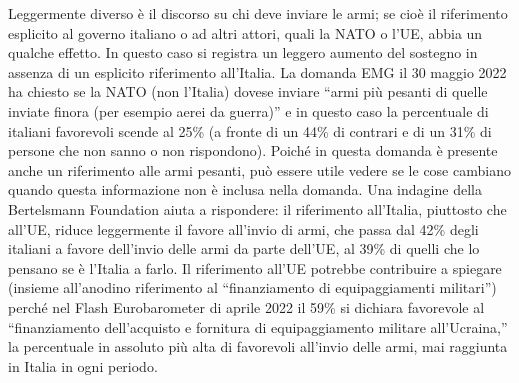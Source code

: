 \documentclass[
  openany]{book}
\begin{document}
Leggermente diverso è il discorso su chi deve inviare le armi; se cioè il riferimento esplicito al governo italiano o ad altri attori, quali la NATO o l'UE, abbia un qualche effetto. In questo caso si registra un leggero aumento del sostegno in assenza di un esplicito riferimento all'Italia. La domanda EMG il 30 maggio 2022 ha chiesto se la NATO (non l'Italia) dovese inviare ``armi più pesanti di quelle inviate finora (per esempio aerei da guerra)'' e in questo caso la percentuale di italiani favorevoli scende al 25\% (a fronte di un 44\% di contrari e di un 31\% di persone che non sanno o non rispondono). Poiché in questa domanda è presente anche un riferimento alle armi pesanti, può essere utile vedere se le cose cambiano quando questa informazione non è inclusa nella domanda. Una indagine della Bertelsmann Foundation aiuta a rispondere: il riferimento all'Italia, piuttosto che all'UE, riduce leggermente il favore all'invio di armi, che passa dal 42\% degli italiani a favore dell'invio delle armi da parte dell'UE, al 39\% di quelli che lo pensano se è l'Italia a farlo. Il riferimento all'UE potrebbe contribuire a spiegare (insieme all'anodino riferimento al ``finanziamento di equipaggiamenti militari'') perché nel Flash Eurobarometer di aprile 2022 il 59\% si dichiara favorevole al ``finanziamento dell'acquisto e fornitura di equipaggiamento militare all'Ucraina,'' la percentuale in assoluto più alta di favorevoli all'invio delle armi, mai raggiunta in Italia in ogni periodo.
\end{document}

